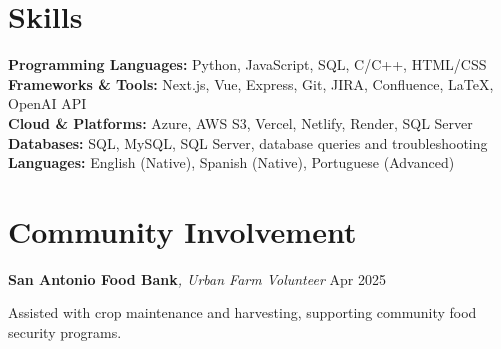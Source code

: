 \documentclass[letterpaper,10pt]{article}
\newcommand{\resumeItem}[1]{\item \small{#1}}
\begin{document}
\section*{Skills}
\begin{compactitem}[leftmargin=0in]
  \item[]
    \textbf{Programming Languages:} Python, JavaScript, SQL, C/C++, HTML/CSS \\
    \textbf{Frameworks \& Tools:} Next.js, Vue, Express, Git, JIRA, Confluence, LaTeX, OpenAI API \\
    \textbf{Cloud \& Platforms:} Azure, AWS S3, Vercel, Netlify, Render, SQL Server \\
    \textbf{Databases:} SQL, MySQL, SQL Server, database queries and troubleshooting \\
    \textbf{Languages:} English (Native), Spanish (Native), Portuguese (Advanced)
\end{compactitem}


\section*{Community Involvement}
\begin{compactitem}
  \item[] 
  \textbf{San Antonio Food Bank}\textit{, Urban Farm Volunteer} \hfill Apr 2025
  
  \begin{compactitem}[leftmargin=0.15in]
    \resumeItem{Assisted with crop maintenance and harvesting, supporting community food security programs.}
  \end{compactitem}
\end{compactitem}
\end{document}
